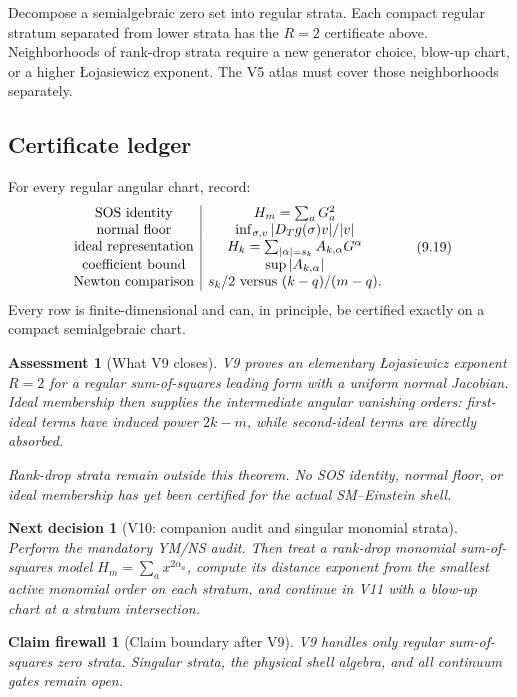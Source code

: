 \documentclass[11pt]{article}
\newtheorem{firewall}[theorem]{Claim firewall}
\newtheorem{decision}[theorem]{Next decision}
\newtheorem{assessment}[theorem]{Assessment}
\theoremstyle{remark}
\begin{document}
Decompose a semialgebraic zero set into regular strata.  Each compact
regular stratum separated from lower strata has the \(R=2\)
certificate above.  Neighborhoods of rank-drop strata require a new
generator choice, blow-up chart, or a higher Łojasiewicz exponent.
The V5 atlas must cover those neighborhoods separately.

\subsection{Certificate ledger}

For every regular angular chart, record:
\[
\begin{array}{c|c}
\text{SOS identity}&H_m=\sum_aG_a^2\\
\text{normal floor}&
\inf_{\sigma,v}|D_Tg(\sigma)v|/|v|\\
\text{ideal representation}&
H_k=\sum_{|\alpha|=s_k}A_{k,\alpha}G^\alpha\\
\text{coefficient bound}&
\sup|A_{k,\alpha}|\\
\text{Newton comparison}&
s_k/2\ \hbox{versus}\ (k-q)/(m-q).
\end{array}                                         \tag{9.19}
\]
Every row is finite-dimensional and can, in principle, be certified
exactly on a compact semialgebraic chart.

\begin{assessment}[What V9 closes]
\label{ass:v17v9-status}
V9 proves an elementary Łojasiewicz exponent \(R=2\) for a regular
sum-of-squares leading form with a uniform normal Jacobian.  Ideal
membership then supplies the intermediate angular vanishing orders:
first-ideal terms have induced power \(2k-m\), while second-ideal
terms are directly absorbed.

Rank-drop strata remain outside this theorem.  No SOS identity,
normal floor, or ideal membership has yet been certified for the
actual SM--Einstein shell.
\end{assessment}

\begin{decision}[V10: companion audit and singular monomial strata]
\label{dec:v17v9-next}
Perform the mandatory YM/NS audit.  Then treat a rank-drop monomial
sum-of-squares model
\(H_m=\sum_a x^{2\alpha_a}\), compute its distance exponent from the
smallest active monomial order on each stratum, and continue in V11
with a blow-up chart at a stratum intersection.
\end{decision}

\begin{firewall}[Claim boundary after V9]
\label{fire:v17v9}
V9 handles only regular sum-of-squares zero strata.  Singular strata,
the physical shell algebra, and all continuum gates remain open.
\end{firewall}
\end{document}
